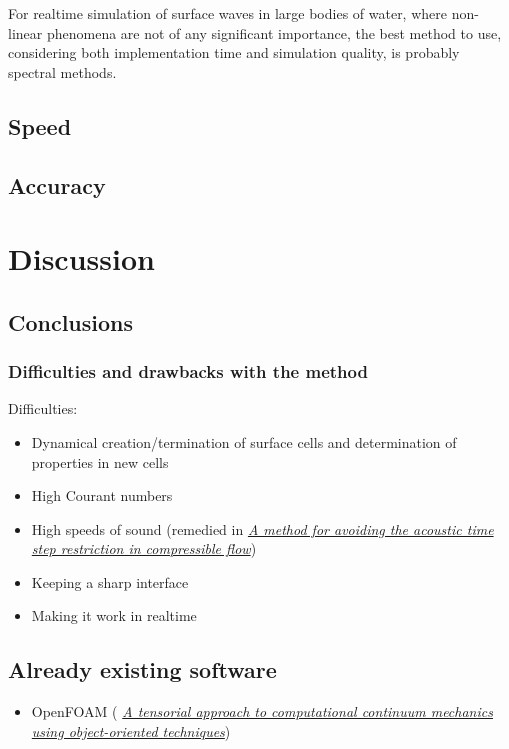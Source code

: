 For realtime simulation of surface waves in large bodies of water, where non-linear phenomena are not of any significant importance, the best method to use, considering both implementation time and simulation quality, is probably spectral methods.

\section{Speed}

\section{Accuracy}

\chapter{Discussion}

\section{Conclusions}

\subsection{Difficulties and drawbacks with the method}

Difficulties:
\begin{itemize}
    \item Dynamical creation/termination of surface cells and determination of properties in new cells
    \item High Courant numbers
    \item High speeds of sound (remedied in \textit{\href{http://physbam.stanford.edu/~kwatra/papers/compressible_semi_implicit/compressible_semi_implicit.pdf}{A method for avoiding the acoustic time step restriction in compressible flow}})
    \item Keeping a sharp interface
    \item Making it work in realtime
\end{itemize}

\section{Already existing software}

\begin{itemize}
    \item OpenFOAM ( \textit{\href{http://powerlab.fsb.hr/ped/kturbo/openfoam/docs/foam.pdf}{A tensorial approach to computational continuum mechanics using object-oriented techniques}})
\end{itemize}

